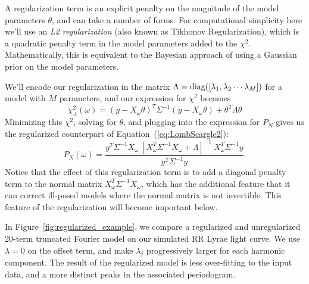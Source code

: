 \documentclass[12pt,preprint]{aastex}
\newcommand{\Fig}[1]{Figure~\ref{fig:#1}}
\newcommand{\fig}[1]{\Fig{#1}}
\newcommand{\Eq}[1]{Equation~(\ref{eq:#1})}
\newcommand{\eq}[1]{\Eq{#1}}
\newcommand{\eqlabel}[1]{\label{eq:#1}}
\begin{document}
A regularization term is an explicit penalty on the magnitude of the model parameters $\theta$, and can take a number of forms. For computational simplicity here we'll use an {\it L2 regularization} (also known as Tikhonov Regularization), which is a quadratic penalty term in the model parameters added to the $\chi^2$. Mathematically, this is equivalent to the Bayesian approach of using a Gaussian prior on the model parameters.

We'll encode our regularization in the matrix $\Lambda = {\rm diag}([\lambda_1, \lambda_2 \cdots \lambda_M])$ for a model with $M$ parameters, and our expression for $\chi^2$ becomes
\begin{equation}
  \eqlabel{chi2reg}
  \chi_\Lambda^2(\omega) = (y - X_\omega\theta)^T\Sigma^{-1}(y - X_\omega\theta) + \theta^T\Lambda\theta
\end{equation}
Minimizing this $\chi^2$, solving for $\theta$, and plugging into the expression for $P_N$ gives us the regularized counterpart of \eq{LombScargle2}:
\begin{equation}
  \eqlabel{LombScargleReg}
  P_N(\omega) = \frac{y^T\Sigma^{-1}X_\omega~[X_\omega^T\Sigma^{-1}X_\omega + \Lambda]^{-1}~X_\omega^T\Sigma^{-1}y}{y^T\Sigma^{-1}y}.
\end{equation}
Notice that the effect of this regularization term is to add a diagonal penalty term to the normal matrix $X_\omega^T\Sigma^{-1}X_\omega$, which has the additional feature that it can correct ill-posed models where the normal matrix is not invertible. This feature of the regularization will become important below.

In \fig{regularized_example}, we compare a regularized and unregularized 20-term truncated Fourier model on our simulated RR Lyrae light curve. We use $\lambda = 0$ on the offset term, and make $\lambda_j$ progressively larger for each harmonic component. The result of the regularized model is less over-fitting to the input data, and a more distinct peaks in the associated periodogram.
\end{document}
